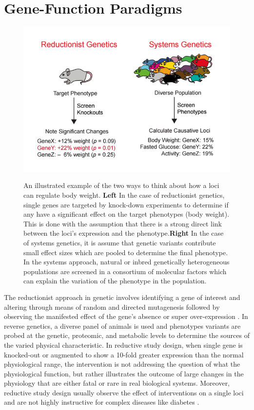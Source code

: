 \documentclass[a4paper]{book}
\begin{document}
	\section{Gene-Function Paradigms}
	
	\begin{figure}[ht]
		\centering
		\includegraphics[width=0.9\linewidth]{1.Introduction_Figures/Reductionnist_genetics.PNG}
		\label{Reductionist vs. Systems Genetics}
		\caption{An illustrated example of the two ways to think about how a loci can regulate body weight. \textbf{Left} In the case of reductionist genetics, single genes are targeted by knock-down experiments to determine if any have a significant effect on the target phenotypes (body weight). This is done with the assumption that there is a strong direct link between the loci's expression and the phenotype.\textbf{Right} In the case of systems genetics, it is assume that genetic variants contribute small effect sizes which are pooled to determine the final phenotype. In the systems approach, natural or inbred genetically heterogeneous populations are screened in a consortium of molecular factors which can explain the variation of the phenotype in the population.}
	\end{figure}
	
	The reductionist approach in genetic involves identifying a gene of interest and altering through means of random and directed mutagenesis followed by observing the manifested effect of the gene's absence or super over-expression \citep{Williams2015TheAnalysis} . In reverse genetics, a diverse panel of animals is used and phenotypes variants are probed at the genetic, proteomic, and metabolic levels to determine the sources of the varied physical characteristic. In reductive study design, when single gene is knocked-out or augmented to show a 10-fold greater expression than the normal physiological range, the intervention is not addressing the question of what the physiological function, but rather illustrates the outcome of large changes in the physiology that are either fatal or rare in real biological systems. Moreover, reductive study design usually observe the effect of interventions on a single  loci and are not highly instructive for complex diseases like diabetes \citep{Williams2015TheAnalysis}.
	
\end{document}
